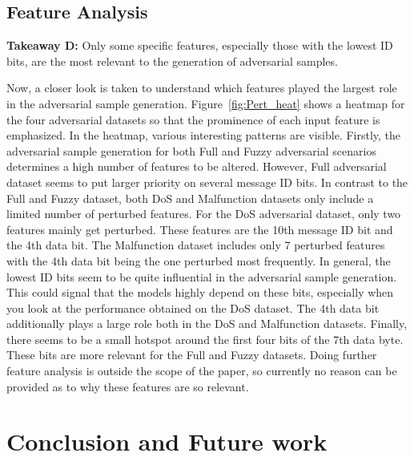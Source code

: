 \documentclass[conference]{IEEEtran}
\begin{document}
\subsection{Feature Analysis}

\begin{tcolorbox}[colback=gray!30,%
                  colframe=black,%
                  width=\columnwidth,%
                  boxrule=0.5pt,
                  arc=1mm, auto outer arc,
                 ]
\noindent\textbf{Takeaway D:} Only some specific features, especially those with the lowest ID bits, are the most relevant to the generation of adversarial samples.

\end{tcolorbox}
Now, a closer look is taken to understand which features played the largest role in the adversarial sample generation. Figure~\ref{fig:Pert_heat} shows a heatmap for the four adversarial datasets so that the prominence of each input feature is emphasized.
In the heatmap, various interesting patterns are visible. Firstly, the adversarial sample generation for both  Full and  Fuzzy adversarial scenarios determines a high number of features to be altered. However,  Full adversarial dataset seems to put larger priority on several message ID bits. In contrast to the Full and Fuzzy dataset, both DoS and Malfunction datasets only include a limited number of perturbed features. For the DoS adversarial dataset, only two features mainly get perturbed. These features are the 10th message ID bit and the 4th data bit. The Malfunction dataset  includes only 7 perturbed features with the 4th data bit being the one perturbed most frequently.
In general, the lowest ID bits seem  to be quite influential in the adversarial sample generation. This could signal that the models highly depend on these bits, especially when you look at the performance obtained on the DoS dataset. The 4th data bit additionally plays a large role both in the DoS and  Malfunction datasets. Finally, there seems to be a small hotspot around the first four bits of the 7th data byte. These bits are more relevant for the Full and Fuzzy datasets. Doing further feature analysis is outside the scope of the paper, so currently no reason can be provided as to why these features are so relevant.



\section{Conclusion and Future work}
\label{sec:conclusion}
\end{document}
